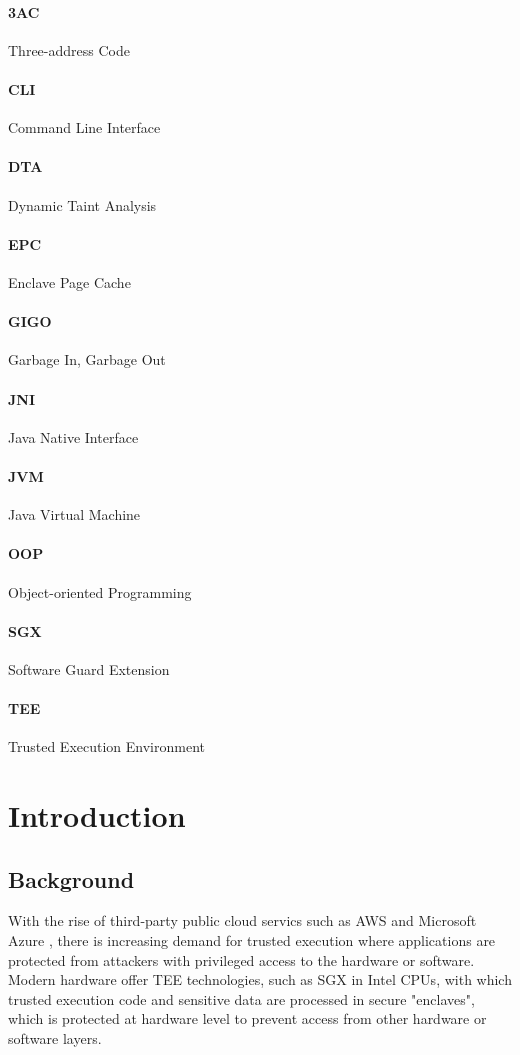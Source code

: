 \documentclass[a4paper, 12pt]{article}
\begin{document}
\paragraph{3AC} Three-address Code
\paragraph{CLI} Command Line Interface
\paragraph{DTA} Dynamic Taint Analysis
\paragraph{EPC} Enclave Page Cache
\paragraph{GIGO} Garbage In, Garbage Out
\paragraph{JNI} Java Native Interface
\paragraph{JVM} Java Virtual Machine
\paragraph{OOP} Object-oriented Programming
\paragraph{SGX} Software Guard Extension
\paragraph{TEE} Trusted Execution Environment

\setlength\parskip{1.3em}

\section{Introduction}
\subsection{Background}
With the rise of third-party public cloud servics
such as AWS \cite{aws} and Microsoft Azure \cite{azure},
there is increasing demand for trusted execution where
applications are protected from
attackers with privileged access to the hardware or software.
Modern hardware offer TEE technologies,
such as SGX in Intel CPUs,
with which trusted execution code and sensitive data
are processed in secure "enclaves",
which is protected at hardware level to prevent access
from other hardware or software layers.
\end{document}
